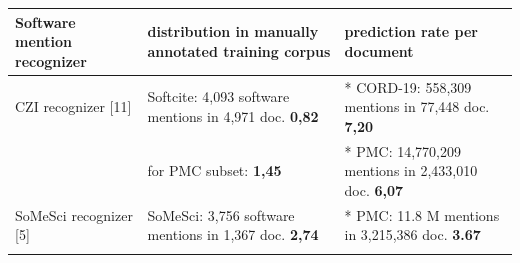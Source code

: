 \documentclass[
]{article}
\begin{document}
\begin{longtable}[]{@{}lll@{}}
\toprule
\begin{minipage}[b]{0.30\columnwidth}\raggedright
Software mention recognizer\strut
\end{minipage} & \begin{minipage}[b]{0.30\columnwidth}\raggedright
distribution in manually annotated training corpus\strut
\end{minipage} & \begin{minipage}[b]{0.30\columnwidth}\raggedright
prediction rate per document\strut
\end{minipage}\tabularnewline
\midrule
\endhead
\begin{minipage}[t]{0.30\columnwidth}\raggedright
CZI recognizer {[}11{]}\strut
\end{minipage} & \begin{minipage}[t]{0.30\columnwidth}\raggedright
Softcite: 4,093 software mentions in 4,971 doc. \textbf{0,82}\strut
\end{minipage} & \begin{minipage}[t]{0.30\columnwidth}\raggedright
* CORD-19: 558,309 mentions in 77,448 doc. \textbf{7,20}\strut
\end{minipage}\tabularnewline
\begin{minipage}[t]{0.30\columnwidth}\raggedright
\strut
\end{minipage} & \begin{minipage}[t]{0.30\columnwidth}\raggedright
for PMC subset: \textbf{1,45}\strut
\end{minipage} & \begin{minipage}[t]{0.30\columnwidth}\raggedright
* PMC: 14,770,209 mentions in 2,433,010 doc. \textbf{6,07}\strut
\end{minipage}\tabularnewline
\begin{minipage}[t]{0.30\columnwidth}\raggedright
SoMeSci recognizer {[}5{]}\strut
\end{minipage} & \begin{minipage}[t]{0.30\columnwidth}\raggedright
SoMeSci: 3,756 software mentions in 1,367 doc. \textbf{2,74}\strut
\end{minipage} & \begin{minipage}[t]{0.30\columnwidth}\raggedright
* PMC: 11.8 M mentions in 3,215,386 doc. \textbf{3.67}\strut
\end{minipage}\tabularnewline
\begin{minipage}[t]{0.30\columnwidth}\raggedright
\strut
\end{minipage} & \begin{minipage}[t]{0.30\columnwidth}\raggedright

\end{minipage}
\end{longtable}
\end{document}
